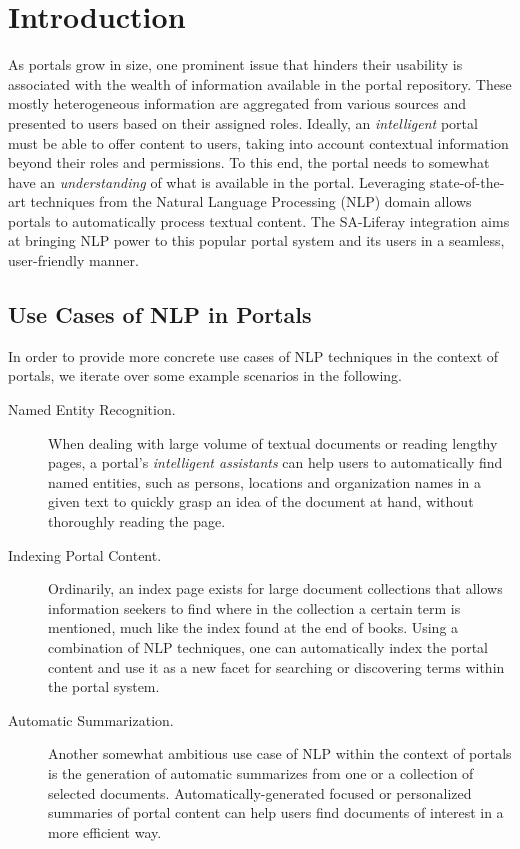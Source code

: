 \section{Introduction}
As portals grow in size, one prominent issue that hinders their usability is associated with the wealth of information available in the portal repository. These mostly heterogeneous information are aggregated from various sources and presented to users based on their assigned roles. Ideally, an \emph{intelligent} portal must be able to offer content to users, taking into account contextual information beyond their roles and permissions. To this end, the portal needs to somewhat have an \emph{understanding} of what is available in the portal. Leveraging state-of-the-art techniques from the Natural Language Processing (NLP) domain allows portals to automatically process textual content. The SA-Liferay integration aims at bringing NLP power to this popular portal system and its users in a seamless, user-friendly manner.

\subsection{Use Cases of NLP in Portals}
In order to provide more concrete use cases of NLP techniques in the context of portals, we iterate over some example scenarios in the following.

\begin{description}
\item[Named Entity Recognition.] When dealing with large volume of textual documents or reading lengthy pages, a portal's \emph{intelligent assistants} can help users to automatically find named entities, such as persons, locations and organization names in a given text to quickly grasp an idea of the document at hand, without thoroughly reading the page. 
\item[Indexing Portal Content.] Ordinarily, an index page exists for large document collections that allows information seekers to find where in the collection a certain term is mentioned, much like the index found at the end of books. Using a combination of NLP techniques, one can automatically index the portal content and use it as a new facet for searching or discovering terms within the portal system.
\item[Automatic Summarization.] Another somewhat ambitious use case of NLP within the context of portals is the generation of automatic summarizes from one or a collection of selected documents. Automatically-generated focused or personalized summaries of portal content can help users find documents of interest in a more efficient way.
\end{description}

